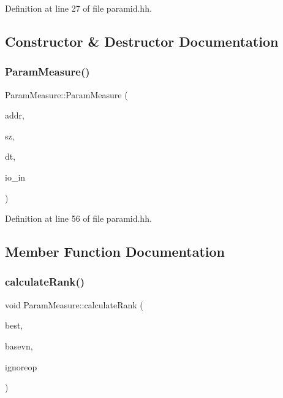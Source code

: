 Definition at line 27 of file paramid.\+hh.



\subsection{Constructor \& Destructor Documentation}
\mbox{\label{class_param_measure_a75cc959002e4d340d6f2196c48da1acf}} 
\subsubsection{\texorpdfstring{ParamMeasure()}{ParamMeasure()}}
{\footnotesize\ttfamily Param\+Measure\+::\+Param\+Measure (\begin{DoxyParamCaption}\item[{const \mbox{\hyperlink{class_address}{Address}} \&}]{addr,  }\item[{int4}]{sz,  }\item[{\mbox{\hyperlink{class_datatype}{Datatype}} $\ast$}]{dt,  }\item[{\mbox{\hyperlink{class_param_measure_a5d9dfe68f44efa9c011528a173f76fec}{Param\+I\+D\+IO}}}]{io\+\_\+in }\end{DoxyParamCaption})\hspace{0.3cm}{\ttfamily [inline]}}



Definition at line 56 of file paramid.\+hh.



\subsection{Member Function Documentation}
\mbox{\label{class_param_measure_a57b2f96e633cb22786292e004b9e37ae}} 
\subsubsection{\texorpdfstring{calculateRank()}{calculateRank()}}
{\footnotesize\ttfamily void Param\+Measure\+::calculate\+Rank (\begin{DoxyParamCaption}\item[{bool}]{best,  }\item[{\mbox{\hyperlink{class_varnode}{Varnode}} $\ast$}]{basevn,  }\item[{\mbox{\hyperlink{class_pcode_op}{Pcode\+Op}} $\ast$}]{ignoreop }\end{DoxyParamCaption})}



